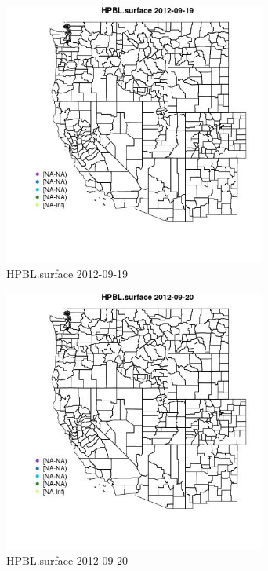 \begin{figure} 
\centering  
\includegraphics[width=0.77\textwidth]{Code_Outputs/ML_input_report_ML_input_PM25_Step5_part_d_de_duplicated_aves_ML_input_MapObsHPBLsurface2012-09-19.jpg} 
\caption{\label{fig:ML_input_report_ML_input_PM25_Step5_part_d_de_duplicated_aves_ML_inputMapObsHPBLsurface2012-09-19}HPBL.surface 2012-09-19} 
\end{figure} 
 

\begin{figure} 
\centering  
\includegraphics[width=0.77\textwidth]{Code_Outputs/ML_input_report_ML_input_PM25_Step5_part_d_de_duplicated_aves_ML_input_MapObsHPBLsurface2012-09-20.jpg} 
\caption{\label{fig:ML_input_report_ML_input_PM25_Step5_part_d_de_duplicated_aves_ML_inputMapObsHPBLsurface2012-09-20}HPBL.surface 2012-09-20} 
\end{figure} 
 

